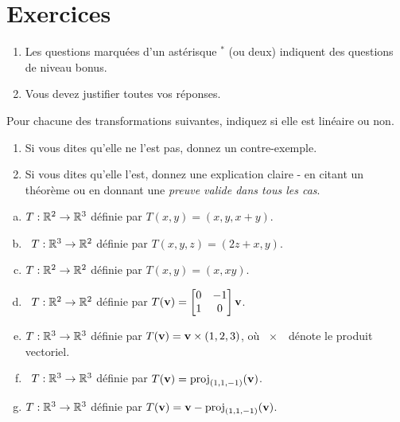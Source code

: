 \section*{Exercices}


\begin{enumerate}
\item Les questions marquées d'un astérisque $ ^\ast$ (ou deux) indiquent des questions de niveau bonus.
 \item Vous devez justifier toutes vos réponses.
\end{enumerate}
\bigskip



 \begin{prob} \label{prob24.1}  Pour chacune des transformations suivantes, indiquez si elle est linéaire ou non.   
   \smallskip    
\begin{enumerate}[$\bullet$]
\item Si vous dites qu'elle ne l'est pas, donnez un contre-exemple.   
\item Si vous dites qu'elle l'est, donnez une explication claire - en citant un théorème ou en donnant une {\it preuve valide dans tous les cas}. 
\end{enumerate}
\medskip

\begin{enumerate}[a)]
\item  $T:\mathbb{R}^2 \to \mathbb{R}^3$ d\'efinie par $T(x,y)=(x, y, x+y)$.
\medskip
 
\item\sov~$T:\mathbb{R}^3 \to \mathbb{R}^2$ d\'efinie par $T(x,y,z)=(2 z+x, y)$.
\medskip
 
\item $T:\mathbb{R}^2 \to \mathbb{R}^2$ d\'efinie par $T(x,y)=(x, x y)$.
\medskip
 

\item\sov~$T:\mathbb{R}^2 \to \mathbb{R}^2$ d\'efinie par $T(\vv)=\bmatrix 0&-1\\ 1&0 \endbmatrix \vv$.
\medskip
 
\item $T:\mathbb{R}^3 \to \mathbb{R}^3$ d\'efinie par $T(\mathbf{v})= \mathbf{v}\times (1,2,3)$, o\`u \og\  $\times$\ \fg\ d\'enote le produit vectoriel.
\medskip
 

\item\sov~$T:\mathbb{R}^3 \to \mathbb{R}^3$ d\'efinie par $T(\mathbf{v})= \operatorname{proj}_{(1,1,-1)}(\mathbf{v})$.
\medskip
 
\item $T:\mathbb{R}^3 \to \mathbb{R}^3$ d\'efinie par $T(\mathbf{v})= \mathbf{v}-\operatorname{proj}_{(1,1,-1)}(\mathbf{v})$.
\medskip
 

\end{enumerate}
\end{prob}
